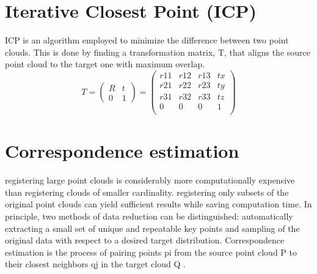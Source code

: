 \documentclass[a4paper]{report}
\begin{document}
\section{Iterative Closest Point (ICP)}
ICP is an algorithm employed to minimize the difference between two point clouds. This is done by finding a transformation matrix, T, that aligns the source point cloud to the target one with maximum overlap. 
 \[ T= \begin{pmatrix}
R & t\\ 
0 & 1 
\end{pmatrix}
= \begin{pmatrix}
r11 &r12 &r13 &tx\\
r21 &r22 &r23 &ty\\
r31 &r32 &r33 &tz\\
0 &0 &0 &1 \\ \end{pmatrix} \]

\section{Correspondence estimation}
registering large point clouds is considerably more computationally expensive than registering
clouds of smaller cardinality. registering only subsets of the original point clouds
can yield sufficient results while saving computation time. In principle, two methods of
data reduction can be distinguished: automatically extracting a small set of unique and
repeatable key points and sampling of the original data with respect to a desired target
distribution.
Correspondence estimation is the process of pairing points pi from the source point
cloud P to their closest neighbors qj in the target cloud Q \cite{proj3}.
\end{document}
